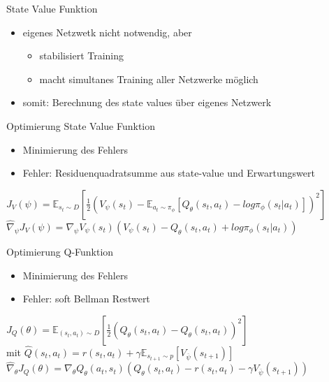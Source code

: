 \begin{frame}{State Value Funktion}
\begin{itemize}
\item eigenes Netzwetk nicht notwendig, aber
\begin{itemize}
\item stabilisiert Training
\item macht simultanes Training aller Netzwerke möglich \\[12pt]
\end{itemize}
\item somit: Berechnung des state values über eigenes Netzwerk
\end{itemize}
\end{frame}

\begin{frame}{Optimierung State Value Funktion}
\begin{itemize}
\item Minimierung des Fehlers
\item Fehler: Residuenquadratsumme aus state-value und Erwartungswert
\end{itemize}
$J_{V}(\psi)=\mathbb{E}_{s_{t}\sim D}\left[\frac{1}{2}(V_{\psi}(s_{t})-\mathbb{E}_{a_{t}\sim \pi_{\phi}}[Q_{\theta}(s_{t},a_{t})-log \pi_{\phi}(s_{t}|a_{t})])^{2}\right]$ \\[12pt]

$\hat{\nabla}_{\psi}J_{V}(\psi)=\nabla_{\psi}V_{\psi}(s_{t})(V_{\psi}(s_{t})-Q_{\theta}(s_{t},a_{t})+log \pi_{\phi}(s_{t}|a_{t}))$
\end{frame}

\begin{frame}{Optimierung Q-Funktion}
\begin{itemize}
\item Minimierung des Fehlers
\item Fehler: soft Bellman Restwert
\end{itemize}
$J_{Q}(\theta)=\mathbb{E}_{(s_{t},a_{t})\sim D}\left[\frac{1}{2}(Q_{\theta}(s_{t},a_{t})-\hat Q_{\theta}(s_{t},a_{t}))^{2}\right]$ \\[12pt]

mit $\hat Q(s_{t},a_{t})=r(s_{t},a_{t})+\gamma \mathbb{E}_{s_{t+1}\sim p}[V_{\overline{\psi}}(s_{t+1})]$ \\[12pt]

$\hat{\nabla}_{\theta}J_{Q}(\theta)=\nabla_{\theta}Q_{\theta}(a_{t},s_{t})(Q_{\theta}(s_{t},a_{t})-r(s_{t},a_{t})-\gamma V_{\overline{\psi}}(s_{t+1}))$
\end{frame}

